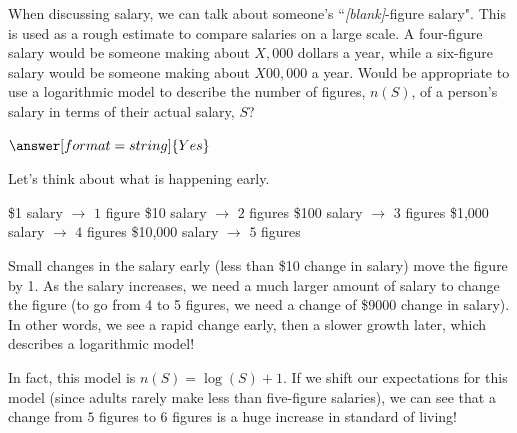 \documentclass{ximera}
\begin{document}
\begin{question}
When discussing salary, we can talk about someone's ``\textit{[blank]}-figure salary". This is used as a rough estimate to compare salaries on a large scale. A four-figure salary would be someone making about $X,000$ dollars a year, while a six-figure salary would be someone making about $X00,000$ a year. Would be appropriate to use a logarithmic model to describe the number of figures, $n(S)$, of a person's salary in terms of their actual salary, $S$?

$\answer[format=string]{Yes}$

\begin{feedback}
Let's think about what is happening early. 

\$1 salary $\rightarrow$ $1$ figure
\$10 salary $\rightarrow$ $2$ figures
\$100 salary $\rightarrow$ $3$ figures
\$1,000 salary $\rightarrow$ $4$ figures
\$10,000 salary $\rightarrow$ $5$ figures

Small changes in the salary early (less than \$10 change in salary) move the figure by 1. As the salary increases, we need a much larger amount of salary to change the figure (to go from 4 to 5 figures, we need a change of \$9000 change in salary). In other words, we see a rapid change early, then a slower growth later, which describes a logarithmic model! 

In fact, this model is $n(S) = \log(S)+1$. If we shift our expectations for this model (since adults rarely make less than five-figure salaries), we can see that a change from $5$ figures to $6$ figures is a huge increase in standard of living!
\end{feedback}

\end{question}
\end{document}
